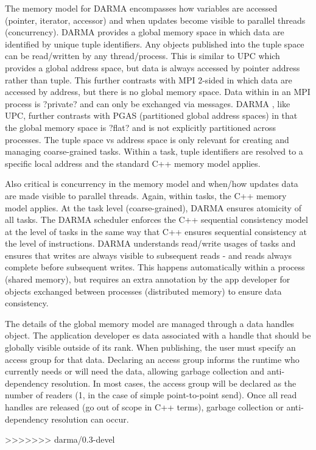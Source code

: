 The memory model for DARMA encompasses how variables are accessed (pointer, iterator, accessor) and when updates become visible to parallel threads (concurrency).  
DARMA provides a global memory space in which data are identified by unique tuple identifiers.  
Any objects published into the tuple space can be read/written by any thread/process. 
This is similar to UPC which provides a global address space, but data is always accessed by pointer address rather than tuple. 
This further contrasts with MPI 2-sided in which data are accessed by address, but there is no global memory space.  
Data within in an MPI process is ?private? and can only be exchanged via messages.  
DARMA , like UPC, further contrasts with PGAS (partitioned global address spaces) in that the global memory space is ?flat? and is not explicitly partitioned across processes.
The tuple space vs address space is only relevant for creating and managing coarse-grained tasks. 
Within a task, tuple identifiers are resolved to a specific local address and the standard C++ memory model applies.

Also critical is concurrency in the memory model and when/how updates data are made visible to parallel threads.  
Again, within tasks, the C++ memory model applies.  
At the task level (coarse-grained), DARMA ensures atomicity of all tasks. 
The DARMA scheduler enforces the C++ sequential consistency model at the level of tasks in the same way that C++ ensures sequential consistency at the level of instructions. 
DARMA understands read/write usages of tasks and ensures that writes are always visible to subsequent reads - and reads always complete before subsequent writes.  
This happens automatically within a process (shared memory), but requires an extra annotation by the app developer for objects exchanged between processes (distributed memory) to ensure data consistency.

The details of the global memory model are managed through a data \glspl{handle} object.  
The application developer es data associated with a handle that should be globally visible
outside of its \gls{rank}.  
When publishing, the user must specify an \gls{access group} for that data.  
Declaring an access group informs the runtime who currently needs or will need the data,  
allowing garbage collection and \gls{anti-dependency} resolution.
In most cases, the access group will be declared as the number of readers (1, in the case of simple point-to-point send).
Once all read handles are released (go out of scope in C++ terms), garbage collection or anti-dependency resolution can occur.

>>>>>>> darma/0.3-devel



